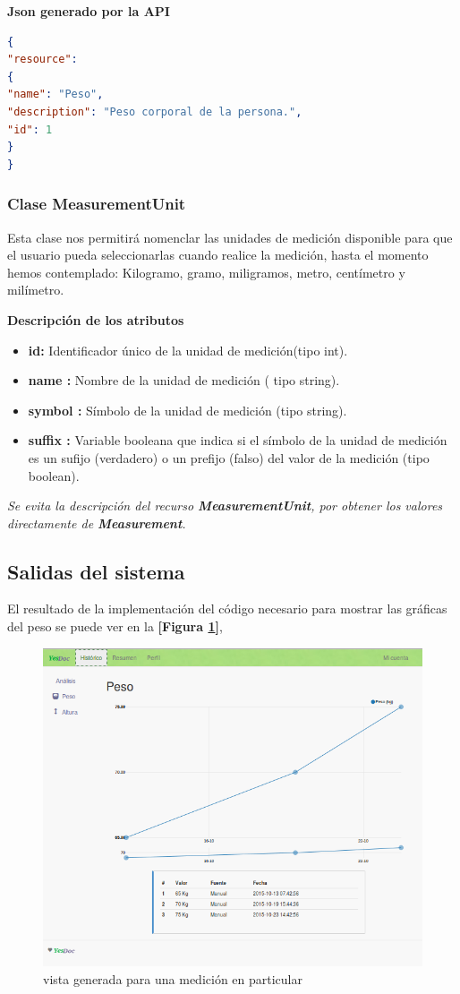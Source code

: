 \textbf{Json generado por la API} 
\begin{lstlisting}[language=json,firstnumber=1]
{
"resource": 
{
"name": "Peso",
"description": "Peso corporal de la persona.",
"id": 1
}
}
\end{lstlisting}


\subsubsection{Clase MeasurementUnit}
Esta clase nos permitirá  nomenclar  las unidades de medición disponible para que el usuario pueda seleccionarlas cuando realice la medición, hasta el momento hemos contemplado: Kilogramo, gramo, miligramos, metro, centímetro y milímetro.

\textbf{Descripción de los atributos}
\begin{itemize}
	\item \textbf{id:	}	Identificador único de la unidad de medición(tipo int).
	\item \textbf{name :	}	Nombre de la unidad de medición ( tipo string).
	\item \textbf{symbol :}		Símbolo de la unidad de medición (tipo string).
	\item \textbf{suffix :}	Variable booleana que indica si el símbolo de la unidad de medición es un sufijo (verdadero) o un prefijo (falso) del valor de la medición (tipo boolean).
\end{itemize}

\textit{Se evita la descripción del recurso \textbf{MeasurementUnit}, por obtener los valores directamente de \textbf{Measurement}.}



\subsection{Salidas del sistema}
El resultado de la implementación del código necesario para mostrar las gráficas del peso se puede ver en la \textbf{[Figura \ref{5-grafica_medicion}]}, 


\begin{figure}[h!]
  \centering
  \includegraphics[width=.8\textwidth]{img/5-grafica_medicion}
  \caption{vista generada para una medición en particular}
  \label{5-grafica_medicion}
\end{figure}


